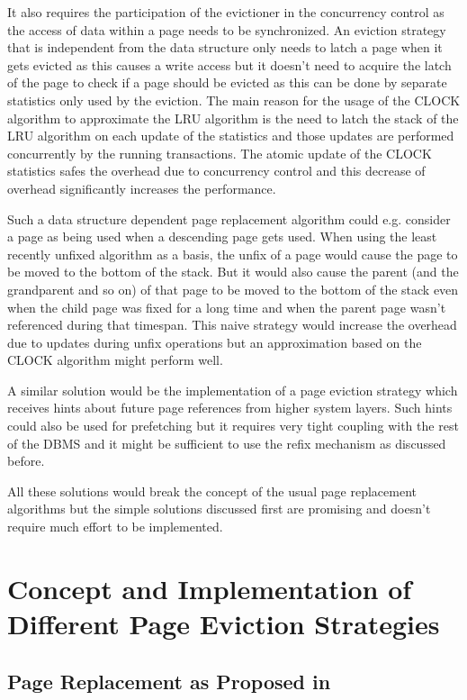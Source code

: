     It also requires the participation of the evictioner in the concurrency control as the access of data within a page needs to be synchronized. An eviction strategy that is independent from the data structure only needs to latch a page when it gets evicted as this causes a write access but it doesn't need to acquire the latch of the page to check if a page should be evicted as this can be done by separate statistics only used by the eviction. The main reason for the usage of the CLOCK algorithm to approximate the LRU algorithm is the need to latch the stack of the LRU algorithm on each update of the statistics and those updates are performed concurrently by the running transactions. The atomic update of the CLOCK statistics safes the overhead due to concurrency control and this decrease of overhead significantly increases the performance.

    Such a data structure dependent page replacement algorithm could e.g. consider a page as being used when a  descending page gets used. When using the least recently unfixed algorithm as a basis, the unfix of a page would cause the page to be moved to the bottom of the stack. But it would also cause the parent (and the grandparent and so on) of that page to be moved to the bottom of the stack even when the child page was fixed for a long time and when the parent page wasn't referenced during that timespan. This naive strategy would increase the overhead due to updates during unfix operations but an approximation based on the CLOCK algorithm might perform well.

    A similar solution would be the implementation of a page eviction strategy which receives hints about future page references from higher system layers. Such hints could also be used for prefetching but it requires very tight coupling with the rest of the DBMS and it might be sufficient to use the refix mechanism as discussed before.

    All these solutions would break the concept of the usual page replacement algorithms but the simple solutions discussed first are promising and doesn't require much effort to be implemented.

\section{Concept and Implementation of Different Page Eviction Strategies}

\subsection{Page Replacement as Proposed in \cite{Graefe:2014}}


